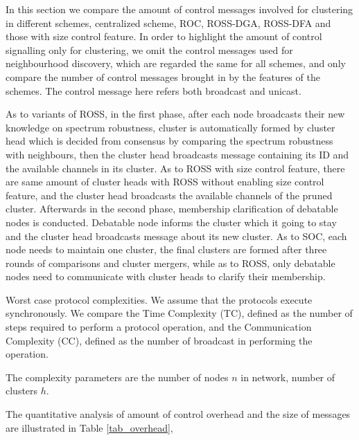 In this section we compare the amount of control messages involved for clustering in different schemes, \eg centralized scheme, ROC, ROSS-DGA, ROSS-DFA and those with size control feature.
In order to highlight the amount of control signalling only for clustering, we omit the control messages used for neighbourhood discovery, which are regarded the same for all schemes, and only compare the number of control messages brought in by the features of the schemes. 
The control message here refers both broadcast and unicast.

As to variants of ROSS, in the first phase, after each node broadcasts their new knowledge on spectrum robustness, cluster is automatically formed by cluster head which is decided from consensus by comparing the spectrum robustness with neighbours, then the cluster head broadcasts message containing its ID and the available channels in its cluster.
As to ROSS with size control feature, there are same amount of cluster heads with ROSS without enabling size control feature, and the cluster head broadcasts the available channels of the pruned cluster.
Afterwards in the second phase, membership clarification of debatable nodes is conducted.
Debatable node informs the cluster which it going to stay and the cluster head broadcasts message about its new cluster.
As to SOC, each node needs to maintain one cluster, the final clusters are formed after three rounds of comparisons and cluster mergers, while as to ROSS, only debatable nodes need to communicate with cluster heads to clarify their membership.

Worst case protocol complexities.
We assume that the protocols execute synchronously. 
We compare the Time Complexity (TC), defined as the number of steps required to perform a protocol operation, and the Communication Complexity (CC), defined as the number of broadcast in performing the operation.

The complexity parameters are the number of nodes $n$ in network, number of clusters $h$.

The quantitative analysis of amount of control overhead and the size of messages are illustrated in Table \ref{tab_overhead}, 

